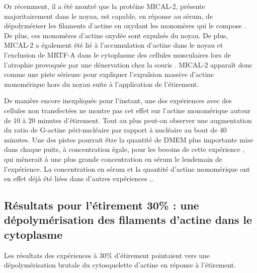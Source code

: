 Or récemment, il a été montré que la protéine MICAL-2, présente majoritairement dans le noyau, est capable, en réponse au sérum, de dépolymériser les filaments d'actine en oxydant les monomères qui le compose \cite{lundquist_redox_2014}. De plus, ces monomères d'actine oxydée sont expulsés du noyau. De plus, MICAL-2 a également été lié à l'accumulation d'actine dans le noyau et l'exclusion de MRTF-A dans le cytoplasme des cellules musculaires lors de l'atrophie provoquée par une dénervation chez la souris \cite{collard_nuclear_2014}. MICAL-2 apparaît donc comme une piste sérieuse pour expliquer l'expulsion massive d'actine monomérique hors du noyau suite à l'application de l'étirement. 

De manière encore inexpliquée pour l'instant, une des expériences avec des cellules non transfectées ne montre pas cet effet sur l'actine monomérique autour de 10 à 20 minutes d'étirement. Tout au plus peut-on observer une augmentation du ratio de G-actine péri-nucléaire par rapport à nucléaire au bout de 40 minutes. Une des pistes pourrait être la quantité de DMEM plus importante mise dans chaque puits, à concentration égale, pour les besoins de cette expérience , qui mènerait à une plus grande concentration en sérum le lendemain de l'expérience. La concentration en sérum et la quantité d'actine monomérique ont en effet déjà été liées dans d'autres expériences \cite{mouilleron_molecular_2008},\cite{vartiainen_nuclear_2007}\cite{lundquist_redox_2014}.  



\subsection{Résultats pour l'étirement 30\% : une dépolymérisation des filaments d'actine dans le cytoplasme}

Les résultats des expériences à 30\% d'étirement pointaient vers une dépolymérisation brutale du cytosquelette d'actine en réponse à l'étirement. 

